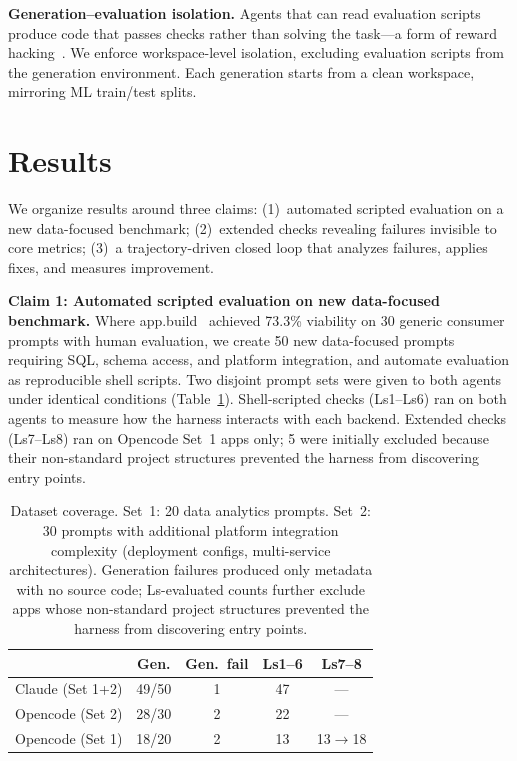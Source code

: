 \documentclass[sigconf,review]{acmart}
\begin{document}
\textbf{Generation--evaluation isolation.} Agents that can read evaluation scripts produce code that passes checks rather than solving the task---a form of reward hacking~\cite{amodei2016concrete}. We enforce workspace-level isolation, excluding evaluation scripts from the generation environment. Each generation starts from a clean workspace, mirroring ML train/test splits.

\section{Results}
\label{sec:results}

We organize results around three claims: (1)~automated scripted evaluation on a new data-focused benchmark; (2)~extended checks revealing failures invisible to core metrics; (3)~a trajectory-driven closed loop that analyzes failures, applies fixes, and measures improvement.

\textbf{Claim 1: Automated scripted evaluation on new data-focused benchmark.} Where app.build~\cite{kniazev2025appbuild} achieved 73.3\% viability on 30 generic consumer prompts with human evaluation, we create 50 new data-focused prompts requiring SQL, schema access, and platform integration, and automate evaluation as reproducible shell scripts. Two disjoint prompt sets were given to both agents under identical conditions (Table~\ref{tab:coverage}). Shell-scripted checks (Ls1--Ls6) ran on both agents to measure how the harness interacts with each backend. Extended checks (Ls7--Ls8) ran on Opencode Set~1 apps only; 5 were initially excluded because their non-standard project structures prevented the harness from discovering entry points.

\begin{table}[t]
\caption{Dataset coverage. Set~1: 20 data analytics prompts. Set~2: 30 prompts with additional platform integration complexity (deployment configs, multi-service architectures). Generation failures produced only metadata with no source code; Ls-evaluated counts further exclude apps whose non-standard project structures prevented the harness from discovering entry points.}
\label{tab:coverage}
\centering
\small
\begin{tabular}{lcccc}
\toprule
& \textbf{Gen.} & \textbf{Gen.~fail} & \textbf{Ls1--6} & \textbf{Ls7--8} \\
\midrule
Claude (Set 1+2)   & 49/50 & 1 & 47 & --- \\
Opencode (Set 2)   & 28/30 & 2 & 22 & --- \\
Opencode (Set 1)   & 18/20 & 2 & 13 & 13$\to$18 \\
\bottomrule
\end{tabular}
\end{table}
\end{document}
